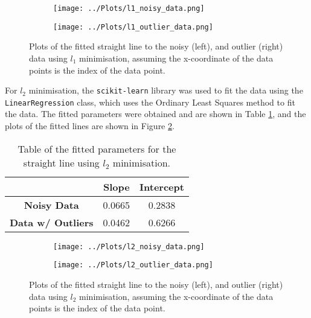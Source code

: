 \documentclass[12pt]{report} %
\begin{document}
\begin{figure}[htbp]
    \centering
    \begin{subfigure}[b]{0.45\textwidth}
        \texttt{[image: ../Plots/l1\_noisy\_data.png]}
    \end{subfigure}
    \hfill
    \begin{subfigure}[b]{0.45\textwidth}
        \texttt{[image: ../Plots/l1\_outlier\_data.png]}
    \end{subfigure}
    \caption{Plots of the fitted straight line to the noisy (left), and outlier (right) data using $l_{1}$ minimisation, assuming the x-coordinate of the data points is the index of the data point.}
    \label{fig:l1_fits}
\end{figure}

For $l_{2}$ minimisation, the \texttt{scikit-learn} library was used to fit the data using the \texttt{LinearRegression} class, which uses the Ordinary Least Squares method to fit the data\cite{sklearn_linear_regression}. The fitted parameters were obtained and are shown in Table \ref{tab:l2_fits}, and the plots of the fitted lines are shown in Figure \ref{fig:l2_fits}.

\begin{table}
    \begin{center}
        \begin{tabular}{ccc}
            \hline
            & \textbf{Slope} & \textbf{Intercept} \\
            \hline
            \textbf{Noisy Data} & 0.0665 & 0.2838 \\
            \textbf{Data w/ Outliers} & 0.0462 & 0.6266 \\
            \hline
        \end{tabular}
        \caption{Table of the fitted parameters for the straight line using $l_{2}$ minimisation.}
        \label{tab:l2_fits}
    \end{center}
\end{table}

\begin{figure}[htbp]
    \centering
    \begin{subfigure}[b]{0.45\textwidth}
        \texttt{[image: ../Plots/l2\_noisy\_data.png]}
    \end{subfigure}
    \hfill
    \begin{subfigure}[b]{0.45\textwidth}
        \texttt{[image: ../Plots/l2\_outlier\_data.png]}
    \end{subfigure}
    \caption{Plots of the fitted straight line to the noisy (left), and outlier (right) data using $l_{2}$ minimisation, assuming the x-coordinate of the data points is the index of the data point.}
    \label{fig:l2_fits}
\end{figure}
\end{document}
